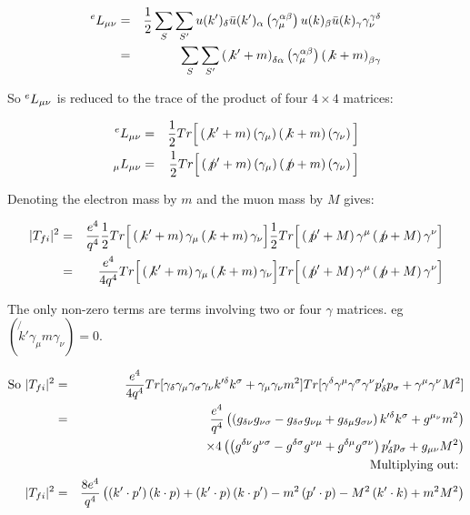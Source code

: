\begin{eqnarray*}
  ^{e}L_{\mu\nu} & = & \frac{1}{2}\sum_{S}\sum_{S'}u(k')_{\delta}\bar{u}(k')_{\alpha} \left(\gamma_{\mu}^{\alpha\beta}\right)u(k)_{\beta}\bar{u}(k)_{\gamma}\gamma_{\nu}^{\gamma\delta} \\
  & = & \sum_{S}\sum_{S'}\left(\not{k}' + m\right)_{\delta\alpha} \left(\gamma_{\mu}^{\alpha\beta}\right) \left(\not{k} + m\right)_{\beta\gamma}
\end{eqnarray*}

So ${}^{e}L_{\mu\nu}$ is reduced to the trace of the product of four $4 \times 4$ matrices:

\begin{eqnarray*}
  {}^{e}L_{\mu\nu} & = & \frac{1}{2}Tr\Big[ \left(\not{k}' + m\right)\left(\gamma_{\mu}\right)\left(\not{k} + m\right)\left(\gamma_{\nu}\right) \Big] \\
  {}_{\mu}L_{\mu\nu} & = & \frac{1}{2}Tr\Big[ \left(\not{p}' + m\right)\left(\gamma_{\mu}\right)\left(\not{p} + m\right)\left(\gamma_{\nu}\right) \Big]
\end{eqnarray*}

Denoting the electron mass by $m$ and the muon mass by $M$ gives:

\begin{eqnarray*}
  |T_{fi}|^2 & = & \frac{e^4}{q^4}\frac{1}{2}Tr\Big[\left(\not{k}' + m\right)\gamma_{\mu}\left(\not{k} + m\right)\gamma_{\nu}\Big]\frac{1}{2}Tr\Big[\left(\not{p}' + M\right)\gamma^{\mu}\left(\not{p} + M\right)\gamma^{\nu}\Big] \\
  & = & \frac{e^4}{4q^4}Tr\Big[\left(\not{k}' + m\right)\gamma_{\mu}\left(\not{k}+m\right)\gamma_{\nu}\Big] Tr\Big[\left(\not{p}' + M\right)\gamma^{\mu}\left(\not{p} + M\right)\gamma^{\nu} \Big]
\end{eqnarray*}

The only non-zero terms are terms involving two or four $\gamma$ matrices.  eg $\left(\not{k}'\gamma_{\mu}m\gamma_{\nu}\right) = 0$.

\begin{eqnarray*}
  \textrm{So } |T_{fi}|^2 & = & \frac{e^4}{4q^4} Tr[\gamma_{\delta}\gamma_{\mu}\gamma_{\sigma}\gamma_{\nu}k'^{\delta}k^{\sigma} + \gamma_{\mu}\gamma_{\nu}m^2]Tr[\gamma^{\delta}\gamma^{\mu}\gamma^{\sigma}\gamma^{\nu}p'_{\delta}p_{\sigma} + \gamma^{\mu}\gamma^{\nu}M^2] \\
  & = & \frac{e^4}{q^4} \left( \left(g_{\delta\nu}g_{\nu\sigma} - g_{\delta\sigma}g_{\nu\mu} + g_{\delta\mu}g_{\sigma\nu}\right)k'^{\delta}k^{\sigma} + g^{\mu_\nu}m^2\right) \\
      && \times 4 \left( \left(g^{\delta\nu}g^{\nu\sigma} - g^{\delta\sigma}g^{\nu\mu} + g^{\delta\mu}g^{\sigma\nu}\right)p'_{\delta}p_{\sigma} + g_{\mu\nu}M^2\right) \\
  &&\textrm{Multiplying out: }\\
  |T_{fi}|^2 & = & \frac{8e^4}{q^4}\left( \left(k'\cdot p'\right)\left(k\cdot p\right) + \left(k'\cdot p\right)\left(k\cdot p'\right) - m^2\left(p'\cdot p\right) - M^2\left(k'\cdot k\right) + m^2M^2\right)
\end{eqnarray*}

